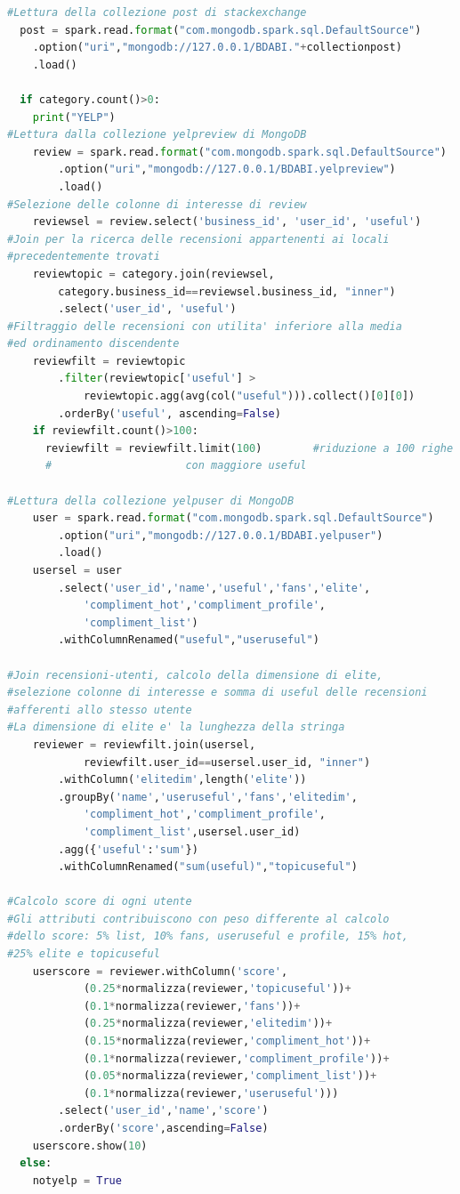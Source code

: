 \begin{lstlisting}[language=Python, caption={Expert Finding}, captionpos=b, label={lst:ef}]
#Lettura della collezione post di stackexchange
  post = spark.read.format("com.mongodb.spark.sql.DefaultSource")
	.option("uri","mongodb://127.0.0.1/BDABI."+collectionpost)
	.load()

  if category.count()>0:
    print("YELP")
#Lettura dalla collezione yelpreview di MongoDB
    review = spark.read.format("com.mongodb.spark.sql.DefaultSource")
    	.option("uri","mongodb://127.0.0.1/BDABI.yelpreview")
    	.load()
#Selezione delle colonne di interesse di review
    reviewsel = review.select('business_id', 'user_id', 'useful')
#Join per la ricerca delle recensioni appartenenti ai locali 
#precedentemente trovati
    reviewtopic = category.join(reviewsel,
    	category.business_id==reviewsel.business_id, "inner")
    	.select('user_id', 'useful')
#Filtraggio delle recensioni con utilita' inferiore alla media 
#ed ordinamento discendente
    reviewfilt = reviewtopic
    	.filter(reviewtopic['useful'] > 
    		reviewtopic.agg(avg(col("useful"))).collect()[0][0])
    	.orderBy('useful', ascending=False)
    if reviewfilt.count()>100:
      reviewfilt = reviewfilt.limit(100)        #riduzione a 100 righe 
      #						con maggiore useful

#Lettura della collezione yelpuser di MongoDB
    user = spark.read.format("com.mongodb.spark.sql.DefaultSource")
    	.option("uri","mongodb://127.0.0.1/BDABI.yelpuser")
    	.load()
    usersel = user
    	.select('user_id','name','useful','fans','elite',
    		'compliment_hot','compliment_profile',
    		'compliment_list')
    	.withColumnRenamed("useful","useruseful")

#Join recensioni-utenti, calcolo della dimensione di elite, 
#selezione colonne di interesse e somma di useful delle recensioni 
#afferenti allo stesso utente
#La dimensione di elite e' la lunghezza della stringa
    reviewer = reviewfilt.join(usersel, 
    		reviewfilt.user_id==usersel.user_id, "inner")
    	.withColumn('elitedim',length('elite'))
    	.groupBy('name','useruseful','fans','elitedim',
    		'compliment_hot','compliment_profile',
    		'compliment_list',usersel.user_id)
    	.agg({'useful':'sum'})
    	.withColumnRenamed("sum(useful)","topicuseful")

#Calcolo score di ogni utente
#Gli attributi contribuiscono con peso differente al calcolo 
#dello score: 5% list, 10% fans, useruseful e profile, 15% hot, 
#25% elite e topicuseful
    userscore = reviewer.withColumn('score', 
	    	(0.25*normalizza(reviewer,'topicuseful'))+
	    	(0.1*normalizza(reviewer,'fans'))+
	    	(0.25*normalizza(reviewer,'elitedim'))+
	    	(0.15*normalizza(reviewer,'compliment_hot'))+
	    	(0.1*normalizza(reviewer,'compliment_profile'))+
	    	(0.05*normalizza(reviewer,'compliment_list'))+
	    	(0.1*normalizza(reviewer,'useruseful')))
    	.select('user_id','name','score')
    	.orderBy('score',ascending=False)
    userscore.show(10)
  else:
    notyelp = True


\end{lstlisting}
